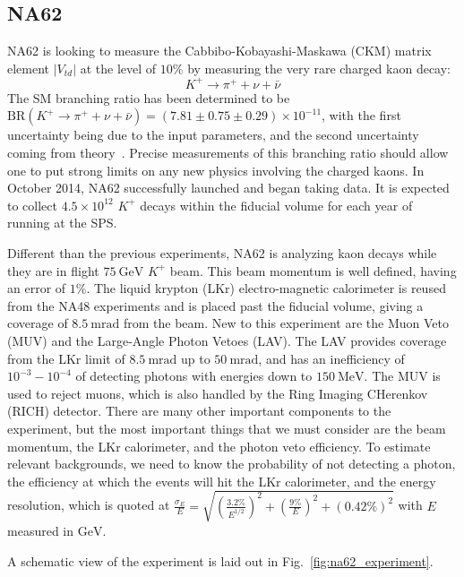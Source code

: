 \subsection{NA62}
NA62 is looking to measure the Cabbibo-Kobayashi-Maskawa (CKM) matrix element $|V_{td}|$ at the level of $10\%$ by measuring the very rare charged kaon decay:
\begin{equation}
K^+ \rightarrow \pi^+ + \nu + \bar{\nu}
\end{equation}
The SM branching ratio has been determined to be $\textrm{BR}(K^+ \rightarrow \pi^+ + \nu + \bar{\nu}) = (7.81 \pm 0.75 \pm 0.29) \times 10^{-11}$, with the first uncertainty being due to the input parameters, and the second uncertainty coming from theory~\cite{Straub:2010ih}.
Precise measurements of this branching ratio should allow one to put strong limits on any new physics involving the charged kaons.
In October 2014, NA62 successfully launched and began taking data.
It is expected to collect $4.5 \times 10^{12}$ $K^+$ decays within the fiducial volume for each year of running at the SPS\@.

Different than the previous experiments, NA62 is analyzing kaon decays while they are in flight $75~\textrm{GeV}$ $K^+$ beam.
This beam momentum is well defined, having an error of $1\%$.
The liquid krypton (LKr) electro-magnetic calorimeter is reused from the NA48 experiments and is placed past the fiducial volume, giving a coverage of $8.5~\textrm{mrad}$ from the beam.
New to this experiment are the Muon Veto (MUV) and the Large-Angle Photon Vetoes (LAV).
The LAV provides coverage from the LKr limit of $8.5~\textrm{mrad}$ up to $50~\textrm{mrad}$, and has an inefficiency of $10^{-3} - 10^{-4}$ of detecting photons with energies down to $150~\textrm{MeV}$.
The MUV is used to reject muons, which is also handled by the Ring Imaging CHerenkov (RICH) detector.
There are many other important components to the experiment, but the most important things that we must consider are the beam momentum, the LKr calorimeter, and the photon veto efficiency.
To estimate relevant backgrounds, we need to know the probability of not detecting a photon, the efficiency at which the events will hit the LKr calorimeter, and the energy resolution, which is quoted at $\frac{\sigma_E}{E} = \sqrt{\left(\frac{3.2\%}{E^{1/2}}\right)^2 + \left(\frac{9\%}{E}\right)^2 + (0.42\%)^2}$ with $E$ measured in $\textrm{GeV}$.

A schematic view of the experiment is laid out in Fig.~\ref{fig:na62_experiment}.

